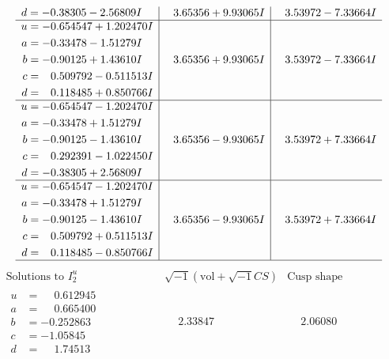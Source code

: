 \documentclass[1p]{elsarticle_modified}
\theoremstyle{definition}
\newcommand{\I}{\sqrt{-1}}
\begin{document}
$$\begin{array}{c|c|c}
\begin{aligned}
d &= -0.38305 - 2.56809 I\end{aligned}
 & \phantom{-}3.65356 + 9.93065 I & \phantom{-}3.53972 - 7.33664 I \\ \hline\begin{aligned}
u &= -0.654547 + 1.202470 I \\
a &= -0.33478 - 1.51279 I \\
b &= -0.90125 + 1.43610 I \\
c &= \phantom{-}0.509792 - 0.511513 I \\
d &= \phantom{-}0.118485 + 0.850766 I\end{aligned}
 & \phantom{-}3.65356 + 9.93065 I & \phantom{-}3.53972 - 7.33664 I \\ \hline\begin{aligned}
u &= -0.654547 - 1.202470 I \\
a &= -0.33478 + 1.51279 I \\
b &= -0.90125 - 1.43610 I \\
c &= \phantom{-}0.292391 - 1.022450 I \\
d &= -0.38305 + 2.56809 I\end{aligned}
 & \phantom{-}3.65356 - 9.93065 I & \phantom{-}3.53972 + 7.33664 I \\ \hline\begin{aligned}
u &= -0.654547 - 1.202470 I \\
a &= -0.33478 + 1.51279 I \\
b &= -0.90125 - 1.43610 I \\
c &= \phantom{-}0.509792 + 0.511513 I \\
d &= \phantom{-}0.118485 - 0.850766 I\end{aligned}
 & \phantom{-}3.65356 - 9.93065 I & \phantom{-}3.53972 + 7.33664 I\\
 \hline 
 \end{array}$$\newpage$$\begin{array}{c|c|c}  
\text{Solutions to }I^u_{2}& \I (\text{vol} + \sqrt{-1}CS) & \text{Cusp shape}\\
 \hline 
\begin{aligned}
u &= \phantom{-}0.612945\phantom{ +0.000000I} \\
a &= \phantom{-}0.665400\phantom{ +0.000000I} \\
b &= -0.252863\phantom{ +0.000000I} \\
c &= -1.05845\phantom{ +0.000000I} \\
d &= \phantom{-}1.74513\phantom{ +0.000000I}\end{aligned}
 & \phantom{-}2.33847\phantom{ +0.000000I} & \phantom{-}2.06080\phantom{ +0.000000I} \\ \hline\begin{aligned}

\end{aligned}
\end{array}$$
\end{document}
